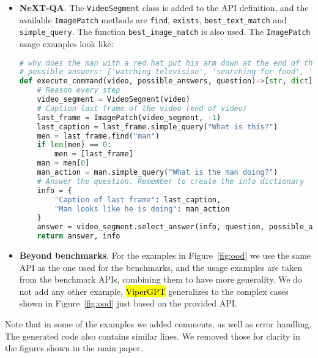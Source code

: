 \documentclass[10pt,twocolumn,letterpaper]{article}
\newcommand{\viper}[0]{{\small\fontfamily{txtt}\selectfont \textcolor{mygreen}{\hl{ViperGPT}}}\xspace}
\begin{document}
\begin{itemize}
\begin{lstlisting}[language=Python, caption=\textbf{OK-VQA example.}, xleftmargin=.0\textwidth, xrightmargin=.0\textwidth]
# Who is famous for allegedly doing this in a lightning storm?
def execute_command(image)->str:
    # The question is not direct perception, so we need to ask the image for more information
    # Salient information: what is being done?
    image = ImagePatch(image)
    guesses = []
    action = image.simple_query("What is being done?")
    external_knowledge_query = "Who is famous for allegedly {} in a lightning storm?".format(action)
    step_by_step_guess = llm_query(external_knowledge_query)
    guesses.append("what is being done is {}".format(action) + ", so " + step_by_step_guess)
    direct_guess = image.simple_query("Who is famous for allegedly doing this in a lightning storm?")
    guesses.append(direct_guess)
    return process_guesses("Who is famous for allegedly doing this in a lightning storm?", guesses)
\end{lstlisting}
\vspace{-0.1cm}
\item \textbf{NeXT-QA}. The \texttt{VideoSegment} class is added to the API definition, and the available \texttt{ImagePatch} methods are \texttt{find}, \texttt{exists}, \texttt{best\_text\_match} and \texttt{simple\_query}. The function \texttt{best\_image\_match} is also used. The \texttt{ImagePatch} usage examples look like:
\begin{lstlisting}[language=Python, caption=\textbf{NeXT-QA example.}, xleftmargin=.0\textwidth, xrightmargin=.0\textwidth]
# why does the man with a red hat put his arm down at the end of the video
# possible answers: ['watching television', 'searching for food', 'move its head', 'looking over cardboard box', 'looks at the camera']
def execute_command(video, possible_answers, question)->[str, dict]:
    # Reason every step
    video_segment = VideoSegment(video)
    # Caption last frame of the video (end of video)
    last_frame = ImagePatch(video_segment, -1)
    last_caption = last_frame.simple_query("What is this?")
    men = last_frame.find("man")
    if len(men) == 0:
        men = [last_frame]
    man = men[0]
    man_action = man.simple_query("What is the man doing?")
    # Answer the question. Remember to create the info dictionary
    info = {
        "Caption of last frame": last_caption,
        "Man looks like he is doing": man_action
    }
    answer = video_segment.select_answer(info, question, possible_answers)
    return answer, info
\end{lstlisting}
    \item \textbf{Beyond benchmarks}. For the examples in Figure~\ref{fig:ood} we use the same API as the one used for the benchmarks, and the usage examples are taken from the benchmark APIs, combining them to have more generality. We do not add any other example, \viper generalizes to the complex cases shown in Figure~\ref{fig:ood} just based on the provided API.
    
\end{itemize}

Note that in some of the examples we added comments, as well as error handling. The generated code also contains similar lines. We removed those for clarity in the figures shown in the main paper. 
\end{document}

